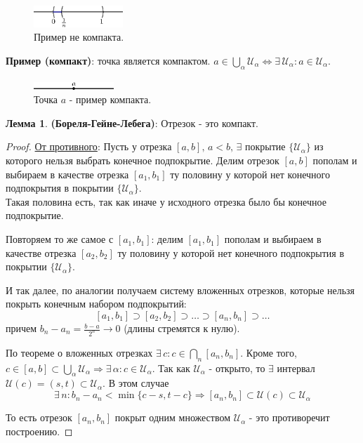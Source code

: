 \documentclass[12pt]{article}
\theoremstyle{definition}
\newtheorem{lemma}{Лемма}
\begin{document}
\begin{figure}[H]
	\centering
	\includegraphics[width=0.3\textwidth]{13_6.eps}
	\caption{Пример не компакта.}
	\label{13_6}
\end{figure}

\textbf{Пример (компакт)}:  точка является компактом. $a \in \bigcup\limits_{\alpha}\mathcal{U}_\alpha \Leftrightarrow \exists \, \mathcal{U}_\alpha \colon a \in \mathcal{U}_\alpha$.

\begin{figure}[H]
	\centering
	\includegraphics[width=0.27\textwidth]{13_7.eps}
	\caption{Точка $a$ - пример компакта.}
	\label{13_7}
\end{figure}

\begin{lemma}\textbf{(Бореля-Гейне-Лебега)}:
	Отрезок - это компакт.
\end{lemma}
\begin{proof}
	\uline{От противного}: Пусть у отрезка $[a,b], \, a < b, \, \exists$ покрытие $\{\mathcal{U}_\alpha\}$ из которого нельзя выбрать конечное подпокрытие. Делим отрезок $[a,b]$ пополам и выбираем в качестве отрезка $[a_1,b_1]$ ту половину у которой нет конечного подпокрытия в покрытии $\{\mathcal{U}_\alpha\}$. \\
	Такая половина есть, так как иначе у исходного отрезка было бы конечное подпокрытие.
	
	Повторяем то же самое с $[a_1,b_1]$: делим $[a_1,b_1]$ пополам и выбираем в качестве отрезка $[a_2,b_2]$ ту половину у которой нет конечного подпокрытия в покрытии $\{\mathcal{U}_\alpha\}$. 
	
	И так далее, по аналогии получаем систему вложенных отрезков, которые нельзя покрыть конечным набором подпокрытий:
	$$[a_1,b_1] \supset [a_2,b_2] \supset \dotsc \supset [a_n, b_n] \supset \dotsc$$ 
	причем $b_n - a_n = \frac{b-a}{2^n} \to 0$ (длины стремятся к нулю). 
	
	По теореме о вложенных отрезках $\exists \, c \colon c \in \bigcap\limits_n [a_n,b_n]$. Кроме того, $c \in [a,b] \subset \bigcup\limits_{\alpha}\mathcal{U}_\alpha \Rightarrow \exists \, \alpha \colon c \in \mathcal{U}_\alpha$. Так как $\mathcal{U}_\alpha$ - открыто, то $\exists$ интервал $\mathcal{U}(c) = (s,t) \subset \mathcal{U}_\alpha$. В этом случае $$\exists \, n \colon b_n - a_n < \min \{c-s, t-c\} \Rightarrow [a_n,b_n] \subset \mathcal{U}(c) \subset \mathcal{U}_\alpha$$
	
	То есть отрезок $[a_n, b_n]$ покрыт одним множеством $\mathcal{U}_\alpha$ - это противоречит построению.
\end{proof}
\end{document}
